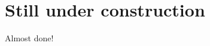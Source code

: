 \documentclass[11pt]{article}
\begin{document}
\section*{Still under construction}
Almost done!
\end{document}
